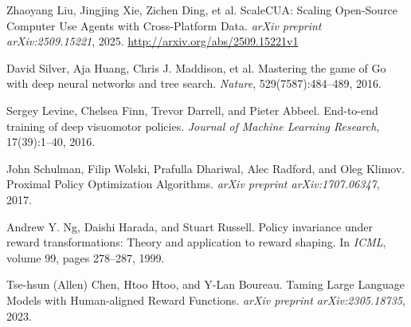 \documentclass{article}
\begin{document}

\begin{thebibliography}{1}

Zhaoyang Liu, Jingjing Xie, Zichen Ding, et al.
\newblock ScaleCUA: Scaling Open-Source Computer Use Agents with Cross-Platform Data.
\newblock \emph{arXiv preprint arXiv:2509.15221}, 2025.
\newblock \href{http://arxiv.org/abs/2509.15221v1}{http://arxiv.org/abs/2509.15221v1}

David Silver, Aja Huang, Chris J. Maddison, et al.
\newblock Mastering the game of Go with deep neural networks and tree search.
\newblock \emph{Nature}, 529(7587):484--489, 2016.

Sergey Levine, Chelsea Finn, Trevor Darrell, and Pieter Abbeel.
\newblock End-to-end training of deep visuomotor policies.
\newblock \emph{Journal of Machine Learning Research}, 17(39):1--40, 2016.

John Schulman, Filip Wolski, Prafulla Dhariwal, Alec Radford, and Oleg Klimov.
\newblock Proximal Policy Optimization Algorithms.
\newblock \emph{arXiv preprint arXiv:1707.06347}, 2017.

Andrew Y. Ng, Daishi Harada, and Stuart Russell.
\newblock Policy invariance under reward transformations: Theory and application to reward shaping.
\newblock In \emph{ICML}, volume 99, pages 278--287, 1999.

Tse-hsun (Allen) Chen, Htoo Htoo, and Y-Lan Boureau.
\newblock Taming Large Language Models with Human-aligned Reward Functions.
\newblock \emph{arXiv preprint arXiv:2305.18735}, 2023.

\end{thebibliography}
\end{document}
